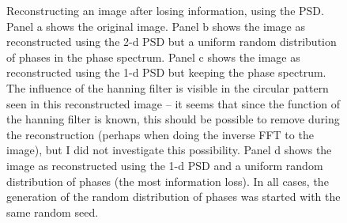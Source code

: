 \documentclass[11pt,preprint]{aastex}
\begin{document}
\begin{figure}[htpb]
\caption{{\small
Reconstructing an image after losing information, using the PSD. 
Panel a shows the original image. Panel b shows the image as reconstructed using the 2-d PSD but a uniform random distribution of phases in the phase spectrum. Panel c shows the image as reconstructed using the 1-d PSD but keeping the phase spectrum. The influence of the hanning filter is visible in the circular pattern seen in this reconstructed image -- it seems that since the function of the hanning filter is known, this should be possible to remove during the reconstruction (perhaps when doing the inverse FFT to the image), but I did not investigate this possibility. Panel d shows the image as reconstructed using the 1-d PSD and a uniform random distribution of phases (the most information loss). In all cases, the generation of the random distribution of phases was started with the same random seed. }}
\label{fig:invert_psd}
\end{figure}
\end{document}
